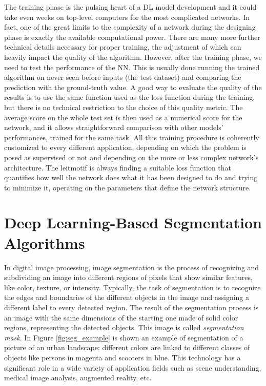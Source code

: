 \documentclass[12pt,a4paper]{report}
\begin{document}
The training phase is the pulsing heart of a DL model development and it could take even weeks on top-level computers for the most complicated networks. In fact, one of the great limits to the complexity of a network during the designing phase is exactly the available computational power. There are many more further technical details necessary for proper training, the adjustment of which can heavily impact the quality of the algorithm. However, after the training phase, we need to test the performance of the NN. This is usually done running the trained algorithm on never seen before inputs (the test dataset) and comparing the prediction with the ground-truth value. A good way to evaluate the quality of the results is to use the same function used as the loss function during the training, but there is no technical restriction to the choice of this quality metric. The average score on the whole test set is then used as a numerical score for the network, and it allows straightforward comparison with other models' performances, trained for the same task. All this training procedure is coherently customized to every different application, depending on which the problem is posed as supervised or not and depending on the more or less complex network's architecture. The leitmotif is always finding a suitable loss function that quantifies how well the network does what it has been designed to do and trying to minimize it, operating on the parameters that define the network structure.

        \clearpage
        \section{Deep Learning-Based Segmentation Algorithms} \label{ssec:segmentation}
In digital image processing, image segmentation is the process of recognizing and subdividing an image into different regions of pixels that show similar features, like color, texture, or intensity. Typically, the task of segmentation is to recognize the edges and boundaries of the different objects in the image and assigning a different label to every detected region. The result of the segmentation process is an image with the same dimensions of the starting one made of solid color regions, representing the detected objects. This image is called \textit{segmentation mask}. In Figure \ref{fig:seg_example} is shown an example of segmentation of a picture of an urban landscape: different colors are linked to different classes of objects like persons in magenta and scooters in blue. This technology has a significant role in a wide variety of application fields such as scene understanding, medical image analysis, augmented reality, etc.
\end{document}
